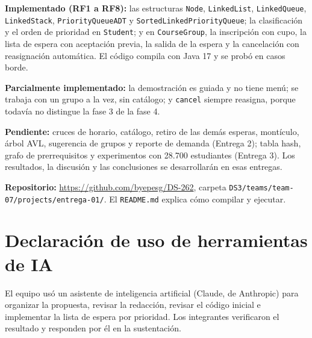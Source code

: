 \documentclass[conference]{IEEEtran}
\begin{document}
\textbf{Implementado (RF1 a RF8):} las estructuras \texttt{Node}, \texttt{LinkedList}, \texttt{LinkedQueue}, \texttt{LinkedStack}, \texttt{PriorityQueueADT} y \texttt{SortedLinkedPriorityQueue}; la clasificación y el orden de prioridad en \texttt{Student}; y en \texttt{CourseGroup}, la inscripción con cupo, la lista de espera con aceptación previa, la salida de la espera y la cancelación con reasignación automática. El código compila con Java 17 y se probó en casos borde.

\textbf{Parcialmente implementado:} la demostración es guiada y no tiene menú; se trabaja con un grupo a la vez, sin catálogo; y \texttt{cancel} siempre reasigna, porque todavía no distingue la fase 3 de la fase 4.

\textbf{Pendiente:} cruces de horario, catálogo, retiro de las demás esperas, montículo, árbol AVL, sugerencia de grupos y reporte de demanda (Entrega 2); tabla hash, grafo de prerrequisitos y experimentos con 28.700 estudiantes (Entrega 3). Los resultados, la discusión y las conclusiones se desarrollarán en esas entregas.

\textbf{Repositorio:} \url{https://github.com/byepesg/DS-262}, carpeta \texttt{DS3/teams/team-07/projects/entrega-01/}. El \texttt{README.md} explica cómo compilar y ejecutar.


\section*{Declaración de uso de herramientas de IA}
El equipo usó un asistente de inteligencia artificial (Claude, de Anthropic) para organizar la propuesta, revisar la redacción, revisar el código inicial e implementar la lista de espera por prioridad. Los integrantes verificaron el resultado y responden por él en la sustentación.

\end{document}
